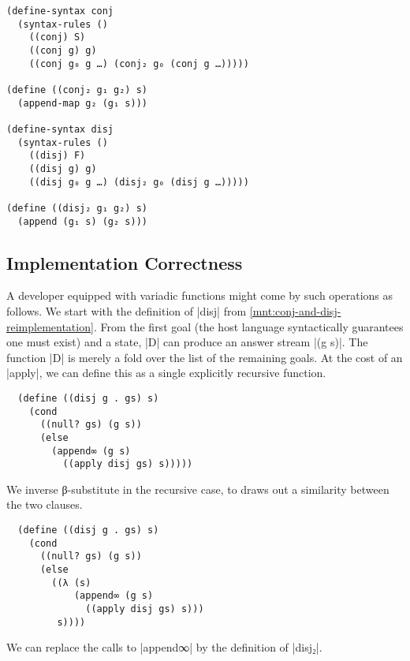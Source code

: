 \documentclass[sigplan,screen,draft,anonymous,review,natbib=false]{acmart}
\begin{document}
\begin{listing}
  \begin{verbatim}
(define-syntax conj
  (syntax-rules ()
    ((conj) S)
    ((conj g) g)
    ((conj g₀ g …) (conj₂ g₀ (conj g …)))))

(define ((conj₂ g₁ g₂) s)
  (append-map g₂ (g₁ s)))

(define-syntax disj
  (syntax-rules ()
    ((disj) F)
    ((disj g) g)
    ((disj g₀ g …) (disj₂ g₀ (disj g …)))))

(define ((disj₂ g₁ g₂) s)
  (append (g₁ s) (g₂ s)))
  \end{verbatim}
  \caption{Macro based implementations of \rackinline|conj| and \rackinline|disj|.}
  \label{mnt:conj-and-disj-implementation}
\end{listing}

\subsection{Implementation Correctness}

A developer equipped with variadic functions might come by such
operations as follows. We start with the definition of
\rackinline|disj| from \cref{mnt:conj-and-disj-reimplementation}. From
the first goal (the host language syntactically guarantees one must
exist) and a state, \rackinline|D| can produce an answer stream
\rackinline|(g s)|. The function \rackinline|D| is merely a fold over
the list of the remaining goals. At the cost of an \rackinline|apply|,
we can define this as a single explicitly recursive function.

\begin{verbatim}
  (define ((disj g . gs) s)
    (cond
      ((null? gs) (g s))
      (else
        (append∞ (g s)
          ((apply disj gs) s)))))
\end{verbatim}

We inverse β-substitute in the recursive case, to draws out a
similarity between the two clauses.

\begin{verbatim}
  (define ((disj g . gs) s)
    (cond
      ((null? gs) (g s))
      (else
        ((λ (s)
            (append∞ (g s)
              ((apply disj gs) s)))
         s))))
\end{verbatim}

We can replace the calls to \rackinline|append∞| by the definition
of \rackinline|disj₂|.
\end{document}
